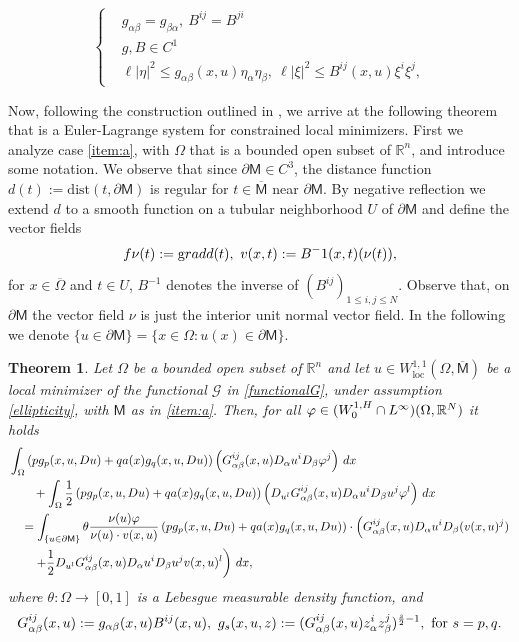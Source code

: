 \documentclass[10pt,a4paper]{amsart}
\theoremstyle{plain}
\newtheorem{theorem}{Theorem}
\theoremstyle{definition}
\theoremstyle{remark}
\newcommand{\R}{\mathbb{R}}
\newcommand{\mm}{\mathsf{M}}
\newcommand{\tx}[1]{\textnormal{\texttt{#1}}}
\def\dx{\,{\rm d}x}
\def\loc{\operatorname{loc}}
\def\eqn#1$$#2$${\begin{equation}\label#1#2\end{equation}}
\begin{document}
\begin{equation} \label{ellipticity}
\begin{cases}
& g_{\alpha \beta} = g_{\beta \alpha}, \ B^{ij} = B^{ji} \\
    & g, B \in C^1 \\ 
    & \ell |\eta|^2 \leq g_{\alpha\beta}(x,u)\eta_\alpha \eta_\beta, \ \ell |\xi|^2 \leq  B^{ij}(x,u) \xi^i \xi^j ,
\end{cases}   
\end{equation}

Now, following the construction outlined in \cite[Theorem 2.1]{F1}, we arrive at the following theorem that is a Euler-Lagrange system for constrained local minimizers. First we analyze case \ref{item:a}, with  $\Omega$ that is a  bounded open subset of $\R^n$, and introduce some notation. We observe that since $\partial \mm \in C^3$, the distance function $d(t):= \text{dist}(t, \partial \mm)$ is regular for $t \in \overline{\mm}$ near $\partial \mm$. By negative reflection we extend $d$ to a smooth function on a tubular neighborhood $U$ of $\partial \mm$ and define the vector fields
\eqn{vf}
$$ \nu(t):= \text{grad} d(t), \ v(x,t):= B^{-1}(x,t)(\nu(t)),$$
for $x \in \overline{\Omega}$ and $t  \in U$, $B^{-1}$ denotes the inverse of $(B^{ij})_{1 \leq i, j \leq N}$. Observe that, on  $\partial \mm$ the vector field $\nu$ is just the interior unit normal vector field. In the following we denote $\{ u \in \partial \mm \} = \{x \in \Omega: u(x) \in \partial \mm \}$.

\begin{theorem}
  Let $\Omega$ be a  bounded open subset of $\R^n$ and let  $u \in W^{1,1}_{\loc}
    (\Omega, \overline{\mm})$ be a local minimizer of the functional $\mathcal{G}$ in \eqref{functionalG}, under assumption  \eqref{ellipticity}, with $\mm$ as in \ref{item:a}. Then, for all $\varphi \in (W^{1,\tx{H}}_0\cap L^{\infty})(\Omega, \R^N)$ it holds
    \begin{align} \label{equation}
    & \int_{\Omega} \left ( pg_p(x,u,Du) + qa(x)g_q(x,u,Du) \right )\left ( G^{ij}_{\alpha \beta}(x,u)D_\alpha u^i D_\beta \varphi^j\right ) \dx \notag  \\ & \qquad + \int_{\Omega} \frac{1}{2} \left ( pg_p(x,u,Du) + qa(x)g_q(x,u,Du)\right )\left ( D_{u^l}G^{ij}_{\alpha \beta} (x,u)D_\alpha u^i D_\beta u^j \varphi^l\right )   \dx \notag \\ 
& \quad = \int_{\{ u \in \partial \mm \}} \theta \frac{\nu(u)\varphi}{\nu(u) \cdot v(x,u)} \left ( pg_p(x,u,Du) + qa(x)g_q(x,u,Du)\right )\cdot \left ( G^{ij}_{\alpha \beta}(x,u)D_\alpha u^i D_\beta (v(x,u)^j) \right . \notag \\ & \qquad \left .+ \frac{1}{2}D_{u^l} G^{ij}_{\alpha \beta} (x,u) D_\alpha u^i D_\beta u^j v(x,u)^l\right )   \dx,
    \end{align}
    where $\theta: \Omega \to [0,1]$ is a Lebesgue measurable density function, and
    $$ G^{ij}_{\alpha \beta}(x,u) := g_{\alpha \beta}(x,u) B^{ij}(x,u), \ g_\tx{s} (x,u,z) := (G^{ij}_{\alpha \beta}(x,u)z_{\alpha}^i z_{\beta}^j)^{\frac{\tx{s}}{2}-1}, \ \text{for } \tx{s}=p,q.$$
\end{theorem}
\end{document}
